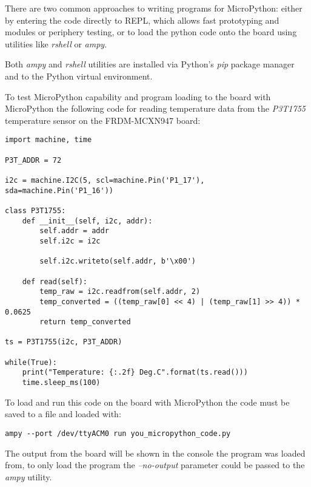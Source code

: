 \documentclass[twoside, 12pt]{article}
\begin{document}
There are two common approaches to writing programs for MicroPython: either by entering the 
code directly to REPL, which allows fast prototyping and modules or periphery testing, or to 
load the python code onto the board using utilities like \textit{rshell} or \textit{ampy}. 

Both \textit{ampy} and \textit{rshell} utilities are installed via Python's \textit{pip} 
package manager and to the Python virtual environment.

To test MicroPython capability and program loading to the board with MicroPython the 
following code for reading temperature data from the \textit{P3T1755} temperature sensor on 
the FRDM-MCXN947 board:
\begin{lstlisting}[caption=Read tempreture data from P3T1755 sensor using MicroPython, breaklines=true]
import machine, time

P3T_ADDR = 72

i2c = machine.I2C(5, scl=machine.Pin('P1_17'), sda=machine.Pin('P1_16'))

class P3T1755:
    def __init__(self, i2c, addr):
        self.addr = addr
        self.i2c = i2c

        self.i2c.writeto(self.addr, b'\x00')

    def read(self):
        temp_raw = i2c.readfrom(self.addr, 2)
        temp_converted = ((temp_raw[0] << 4) | (temp_raw[1] >> 4)) * 0.0625
        return temp_converted

ts = P3T1755(i2c, P3T_ADDR)

while(True):
    print("Temperature: {:.2f} Deg.C".format(ts.read()))
    time.sleep_ms(100)
\end{lstlisting}

To load and run this code on the board with MicroPython the code must be saved to a file and 
loaded with:
\begin{lstlisting}[caption=Loading a program to FRDM-MCXN947 board with MicroPython using ampy utility, breaklines=true]
ampy --port /dev/ttyACM0 run you_micropython_code.py
\end{lstlisting}

The output from the board will be shown in the console the program was loaded from, to only 
load the program the \textit{--no-output} parameter could be passed to the \textit{ampy} 
utility.

\obrazek
{}
\end{document}
